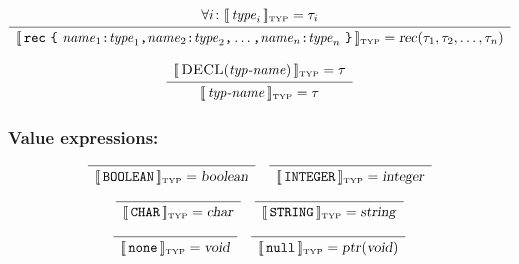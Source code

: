 \documentclass[10pt]{article}
\begin{document}
$$ \begin{array}{c}
   \forall i\colon \typattr{\nont{type}_i} = \tau_i
   \\[2pt]\hline\\[-10pt]
   \typattr{\term{rec}\ \term{\{}\ \nont{name}_1\term{:}\nont{type}_1\term{,}\nont{name}_2\term{:}\nont{type}_2\term{,}\ldots\term{,}\nont{name}_n\term{:}\nont{type}_n\ \term{\}}} = \type{rec}(\tau_1,\tau_2,\ldots,\tau_n)
   \end{array} $$

$$ \begin{array}{c}
   [\![\,\mbox{\textsc{DECL}}(\mbox{\textit{typ-name}})\,]\!]_{\mbox{\tiny TYP}} = \tau
   \\[2pt]\hline\\[-10pt]
   [\![\,\mbox{\textit{typ-name}}\,]\!]_{\mbox{\tiny TYP}} = \tau
   \end{array} $$
  
\subsubsection{Value expressions:}

\medskip

$$ \begin{array}{c}
   \hline\\[-10pt]
   [\![\,\mbox{\texttt{BOOLEAN}}\,]\!]_{\mbox{\tiny TYP}} = \mbox{\textsl{boolean}}
   \end{array}
  \quad
   \begin{array}{c}
   \hline\\[-10pt]
   [\![\,\mbox{\texttt{INTEGER}}\,]\!]_{\mbox{\tiny TYP}} = \mbox{\textsl{integer}}
   \end{array} $$

$$ \begin{array}{c}
   \hline\\[-10pt]
   [\![\,\mbox{\texttt{CHAR}}\,]\!]_{\mbox{\tiny TYP}} = \mbox{\textsl{char}}
   \end{array}
  \quad
   \begin{array}{c}
   \hline\\[-10pt]
   [\![\,\mbox{\texttt{STRING}}\,]\!]_{\mbox{\tiny TYP}} = \mbox{\textsl{string}}
   \end{array} $$

$$ \begin{array}{c}
   \hline\\[-10pt]
   [\![\,\mbox{\texttt{none}}\,]\!]_{\mbox{\tiny TYP}} = \mbox{\textsl{void}}
   \end{array}
  \quad
   \begin{array}{c}
   \hline\\[-10pt]
   [\![\,\mbox{\texttt{null}}\,]\!]_{\mbox{\tiny TYP}} = \mbox{\textsl{ptr}}(\mbox{\textsl{void}})
   \end{array} $$
\end{document}
